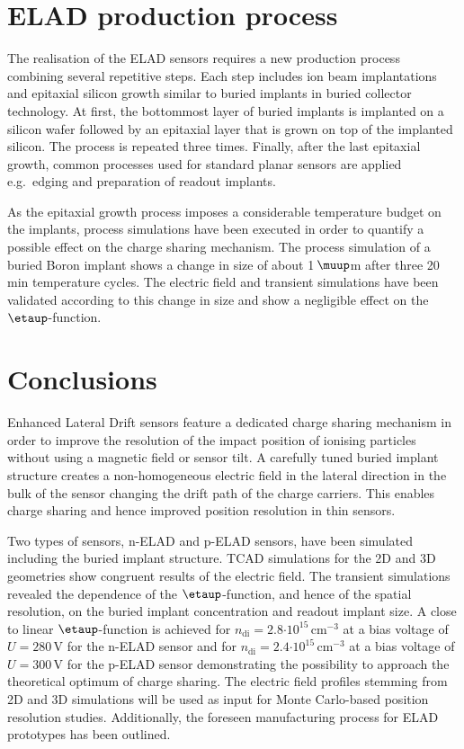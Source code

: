 \documentclass[a4paper,11pt]{article}
\begin{document}
\section{ELAD production process}
\label{sec:pr}
The realisation of the ELAD sensors requires a new production process combining several repetitive steps.
Each step includes ion beam implantations and epitaxial silicon growth similar to buried implants in buried collector technology. 
At first, the bottommost layer of buried implants is implanted on a silicon wafer followed by an epitaxial layer that is grown on top of the implanted silicon. 
The process is repeated three times. 
Finally, after the last epitaxial growth, common processes used for standard planar sensors are applied e.g.\ edging and preparation of readout implants.

As the epitaxial growth process imposes a considerable temperature budget on the implants, process simulations have been executed in order to quantify a possible effect on the charge sharing mechanism. 
The process simulation of a buried Boron implant shows a change in size of about 1\,$\muup$m after three 20\,min temperature cycles. 
The electric field and transient simulations have been validated according to this change in size and show a negligible effect on the $\etaup$-function.


\section{Conclusions}
Enhanced Lateral Drift sensors feature a dedicated charge sharing mechanism in order to improve the resolution of the impact position of ionising particles without using a magnetic field or sensor tilt.
A carefully tuned buried implant structure creates a non-homogeneous electric field in the lateral direction in the bulk of the sensor changing the drift path of the charge carriers.
This enables charge sharing and hence improved position resolution in thin sensors. 

Two types of sensors, n-ELAD and p-ELAD sensors, have been simulated including the buried implant structure. 
TCAD simulations for the 2D and 3D geometries show congruent results of the electric field.
The transient simulations revealed the dependence of the $\etaup$-function, and hence of the spatial resolution, on the buried implant concentration and readout implant size.
A close to linear $\etaup$-function is achieved for $n\mathrm{_{di}} = 2.8 \mathrm{\cdot10^{15}\,cm^{-3}}$ at a bias voltage of $U=280$\,V for the n-ELAD sensor 
 and for $n\mathrm{_{di}} = 2.4 \mathrm{\cdot10^{15}\,cm^{-3}}$ at a bias voltage of $U=300$\,V for the p-ELAD sensor
 demonstrating the possibility to approach the theoretical optimum of charge sharing.
The electric field profiles stemming from 2D and 3D simulations will be used as input for Monte Carlo-based position resolution studies.
Additionally, the foreseen manufacturing process for ELAD prototypes has been outlined. 
\end{document}
